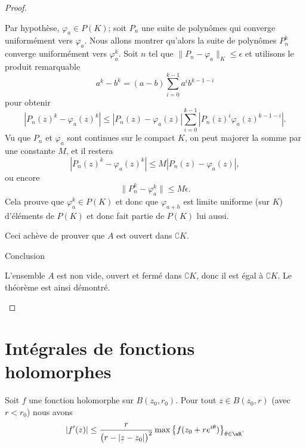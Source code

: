 \begin{proof}
\begin{subproof}
        Par hypothèse, \( \varphi_a\in P(K)\); soit \( P_n\) une suite de polynômes qui converge uniformément vers \( \varphi_a\). Nous allons montrer qu'alors la suite de polynômes \( P_n^k\) converge uniformément vers \( \varphi_a^k\). Soit \( n\) tel que \( \| P_n-\varphi_a \|_{K}\leq \epsilon\) et utilisons le produit remarquable
        \begin{equation}
            a^k-b^k=(a-b)\sum_{i=0}^{k-1}a^ib^{k-1-i}
        \end{equation}
        pour obtenir
        \begin{equation}
            | P_n(z)^k-\varphi_a(z)^k |\leq | P_n(z)-\varphi_a(z) |\sum_{i=0}^{k-1}| P_n(z)^i\varphi_a(z)^{k-1-i} |.
        \end{equation}
        Vu que \( P_n\) et \( \varphi_a\) sont continues sur le compact \( K\), on peut majorer la somme par une constante \( M\), et il restera
        \begin{equation}
            | P_n(z)^k-\varphi_a(z)^k |\leq M | P_n(z)-\varphi_a(z) |,
        \end{equation}
        ou encore
        \begin{equation}
            \| P_n^k-\varphi_a^k \|\leq M\epsilon.
        \end{equation}
        Cela prouve que \( \varphi_a^{k}\in P(K)\) et donc que \( \varphi_{a+h}\) est limite uniforme (sur \( K\)) d'éléments de \( P(K)\) et donc fait partie de \( P(K)\) lui aussi.

        Ceci achève de prouver que \( A\) est ouvert dans \( \complement K\).
    \item[Conclusion]

        L'ensemble \( A\) est non vide, ouvert et fermé dans \( \complement K\), donc il est égal à \( \complement K\). Le théorème est ainsi démontré.
    \end{subproof}
\end{proof}

\section{Intégrales de fonctions holomorphes}

\begin{lemma}       \label{LemNAnweA}
    Soit \( f\) une fonction holomorphe sur \( B(z_0,r_0)\). Pour tout \( z\in B(z_0,r)\) (avec \( r<r_0\)) nous avons
    \begin{equation}
        | f'(z) |\leq \frac{ r }{ \big( r-| z-z_0 | \big)^2 }\max\big\{ f(z_0+r e^{i\theta}) \big\}_{\theta\in \eR}.
    \end{equation}
\end{lemma}


